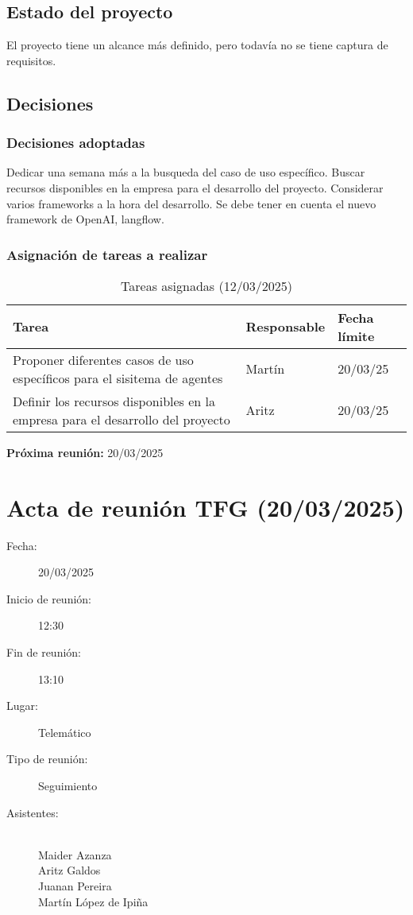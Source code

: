 \subsection{Estado del proyecto}
El proyecto tiene un alcance más definido, pero todavía no se tiene captura de requisitos.

\subsection{Decisiones}
\subsubsection{Decisiones adoptadas}
Dedicar una semana más a la busqueda del caso de uso específico.
Buscar recursos disponibles en la empresa para el desarrollo del proyecto.
Considerar varios frameworks a la hora del desarrollo. Se debe tener en cuenta el nuevo framework de OpenAI, langflow.

\subsubsection{Asignación de tareas a realizar}
\begin{table}[h]
    \centering
    \begin{tabular}{|p{8cm}|p{3cm}|p{3cm}|}
        \hline
        \textbf{Tarea} & \textbf{Responsable} & \textbf{Fecha límite} \\
        \hline
        Proponer diferentes casos de uso específicos para el sisitema de agentes & Martín & 20/03/25 \\
        \hline
        Definir los recursos disponibles en la empresa para el desarrollo del proyecto & Aritz & 20/03/25 \\
        \hline
    \end{tabular}
    \caption{Tareas asignadas (12/03/2025)}
\end{table}

\textbf{Próxima reunión:} 20/03/2025

\clearpage

\section{Acta de reunión TFG (20/03/2025)}

\begin{description}
    \item[Fecha:] 20/03/2025
    \item[Inicio de reunión:] 12:30
    \item[Fin de reunión:] 13:10
    \item[Lugar:] Telemático
    \item[Tipo de reunión:] Seguimiento
    \item[Asistentes:] ~\\
    Maider Azanza\\
    Aritz Galdos\\
    Juanan Pereira\\
    Martín López de Ipiña
\end{description}

